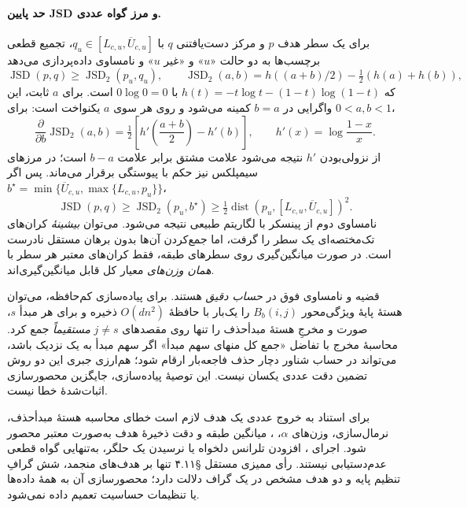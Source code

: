 \paragraph{حد پایین JSD و مرز گواه عددی.}
برای یک سطر هدف $p$ و مرکز دست‌یافتنی $q$ با
$q_u\in[L_{c,u},\overline U_{c,u}]$،
تجمیع قطعی برچسب‌ها به دو حالت «$u$» و «غیر $u$»
و نامساوی داده‌پردازی می‌دهد
\[
\operatorname{JSD}(p,q)\ge
\operatorname{JSD}_2(p_u,q_u),\qquad
\operatorname{JSD}_2(a,b)
=h((a+b)/2)-\tfrac12(h(a)+h(b)),
\]
که $h(t)=-t\log t-(1-t)\log(1-t)$ با $0\log0=0$ است.
برای $a$ ثابت، این واگرایی در $b=a$ کمینه می‌شود و روی
هر سوی $a$ یکنواخت است: برای $0<a,b<1$،
\[
\frac{\partial}{\partial b}\operatorname{JSD}_2(a,b)
=\tfrac12\left[
h'\!\left(\frac{a+b}{2}\right)-h'(b)\right],
\qquad h'(x)=\log\frac{1-x}{x}.
\]
از نزولی‌بودن $h'$ نتیجه می‌شود علامت مشتق برابر علامت
$b-a$ است؛ در مرزهای سیمپلکس نیز حکم با پیوستگی برقرار می‌ماند.
پس اگر
$b^\star=\min\{\overline U_{c,u},\max\{L_{c,u},p_u\}\}$،
\begin{equation}\label{eq:app-ch3-feasibility-js-lower}
\boxed{\operatorname{JSD}(p,q)\ge
\operatorname{JSD}_2(p_u,b^\star)
\ge\tfrac12\operatorname{dist}(p_u,
[L_{c,u},\overline U_{c,u}])^2.}
\end{equation}
نامساوی دوم از پینسکر با لگاریتم طبیعی نتیجه می‌شود.
می‌توان \emph{بیشینهٔ} کران‌های تک‌مختصه‌ای یک سطر را گرفت،
اما جمع‌کردن آن‌ها بدون برهان مستقل نادرست است.
در صورت میانگین‌گیری روی سطرهای طبقه، فقط کران‌های معتبر
هر سطر با \emph{همان وزن‌های} معیار کل قابل میانگین‌گیری‌اند.

قضیه و نامساوی فوق در \emph{حساب دقیق} هستند.
برای پیاده‌سازی کم‌حافظه، می‌توان هستهٔ پایهٔ ویژگی‌محور
$B_b(i,j)$ را یک‌بار با حافظهٔ $O(dn^2)$ ذخیره و برای هر مبدأ
$s$، صورت و مخرجِ هستهٔ مبدأحذف را تنها روی مقصدهای $j\ne s$
\emph{مستقیماً} جمع کرد. محاسبهٔ مخرج با تفاضل «جمع کل منهای
سهم مبدأ» اگر سهم مبدأ به یک نزدیک باشد، می‌تواند در حساب
شناور دچار حذف فاجعه‌بار ارقام شود؛ هم‌ارزی جبری این دو روش
تضمین دقت عددی یکسان نیست. این توصیهٔ پیاده‌سازی، جایگزین
محصورسازی اثبات‌شدهٔ خطا نیست.

برای استناد به خروج عددی یک هدف لازم است خطای محاسبه هستهٔ
مبدأحذف، نرمال‌سازی، وزن‌های $\alpha$، ،
میانگین طبقه و دقت ذخیرهٔ هدف به‌صورت معتبر محصور شود.
اجرای ، افزودن تلرانس دلخواه یا نرسیدن یک
حلگر، به‌تنهایی گواه قطعی عدم‌دستیابی نیستند.
رأی ممیزی مستقل §۴.۱۱ تنها بر هدف‌های  منجمد،
شش گرافِ تنظیم پایه و دو هدف مشخص در یک گراف دلالت دارد؛
محصورسازی آن به همهٔ داده‌ها یا تنظیمات حساسیت تعمیم داده نمی‌شود.


